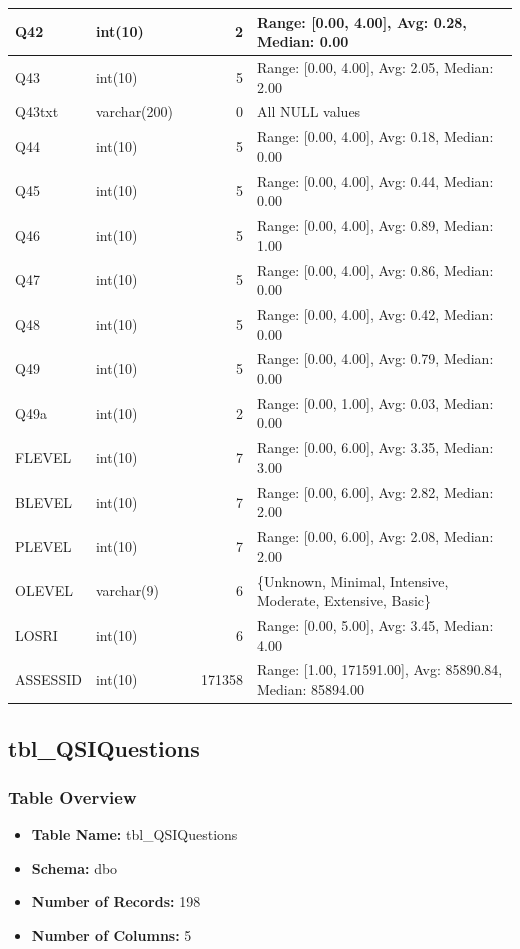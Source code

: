 \begin{landscape}
\begin{longtable}{|l|l|l|r|p{6cm}|}
\hline
Q42 & int(10) &  & 2 & Range: [0.00, 4.00], Avg: 0.28, Median: 0.00 \\
\hline
Q43 & int(10) &  & 5 & Range: [0.00, 4.00], Avg: 2.05, Median: 2.00 \\
\hline
Q43txt & varchar(200) &  & 0 & All NULL values \\
\hline
Q44 & int(10) &  & 5 & Range: [0.00, 4.00], Avg: 0.18, Median: 0.00 \\
\hline
Q45 & int(10) &  & 5 & Range: [0.00, 4.00], Avg: 0.44, Median: 0.00 \\
\hline
Q46 & int(10) &  & 5 & Range: [0.00, 4.00], Avg: 0.89, Median: 1.00 \\
\hline
Q47 & int(10) &  & 5 & Range: [0.00, 4.00], Avg: 0.86, Median: 0.00 \\
\hline
Q48 & int(10) &  & 5 & Range: [0.00, 4.00], Avg: 0.42, Median: 0.00 \\
\hline
Q49 & int(10) &  & 5 & Range: [0.00, 4.00], Avg: 0.79, Median: 0.00 \\
\hline
Q49a & int(10) &  & 2 & Range: [0.00, 1.00], Avg: 0.03, Median: 0.00 \\
\hline
FLEVEL & int(10) &  & 7 & Range: [0.00, 6.00], Avg: 3.35, Median: 3.00 \\
\hline
BLEVEL & int(10) &  & 7 & Range: [0.00, 6.00], Avg: 2.82, Median: 2.00 \\
\hline
PLEVEL & int(10) &  & 7 & Range: [0.00, 6.00], Avg: 2.08, Median: 2.00 \\
\hline
OLEVEL & varchar(9) &  & 6 & \{Unknown, Minimal, Intensive, Moderate, Extensive, Basic\} \\
\hline
LOSRI & int(10) &  & 6 & Range: [0.00, 5.00], Avg: 3.45, Median: 4.00 \\
\hline
ASSESSID & int(10) &  & 171358 & Range: [1.00, 171591.00], Avg: 85890.84, Median: 85894.00 \\
\hline
\end{longtable}

\subsection{tbl\_QSIQuestions}

\subsubsection{Table Overview}
\begin{itemize}
\item \textbf{Table Name:} tbl\_QSIQuestions
\item \textbf{Schema:} dbo
\item \textbf{Number of Records:} 198
\item \textbf{Number of Columns:} 5
\end{itemize}


\end{landscape}
